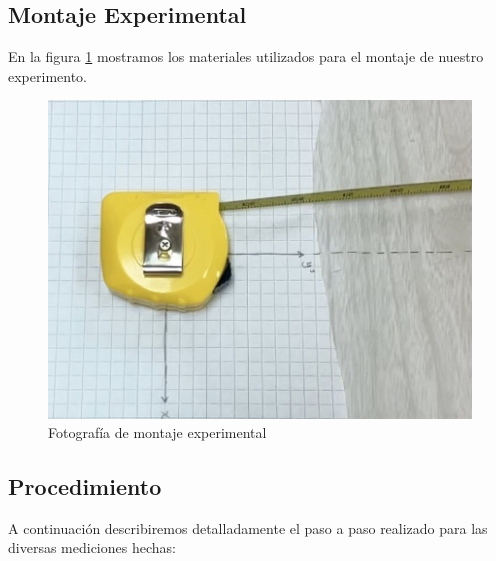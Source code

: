 \documentclass[11pt]{article}
\begin{document}
\subsection{Montaje Experimental}
  En la figura \ref{fig:montaje} mostramos los materiales utilizados para el montaje de nuestro experimento.
  
\begin{figure}[ht]
    \centering
    \includegraphics[scale=0.25]{Informe/img/montaje1.png}
    \caption{Fotografía de montaje experimental}
    \label{fig:montaje}
\end{figure}
    
\subsection{Procedimiento}
A continuación describiremos detalladamente el paso a paso realizado para las diversas mediciones hechas:
\end{document}
